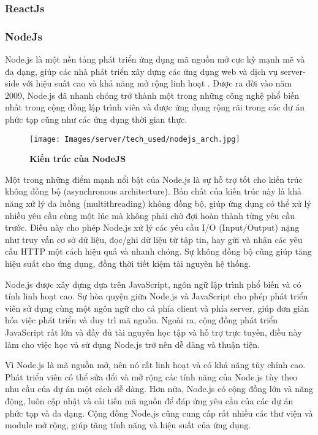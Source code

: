 \subsubsection{ReactJs}

\subsubsection{NodeJs}
\mbox{}

Node.js là một nền tảng phát triển ứng dụng mã nguồn mở cực kỳ mạnh mẽ và đa dạng, giúp các nhà phát triển xây dựng các ứng dụng web và dịch vụ server-side với hiệu suất cao và khả năng mở rộng linh hoạt \cite{nodejs_1}. Được ra đời vào năm 2009, Node.js đã nhanh chóng trở thành một trong những công nghệ phổ biến nhất trong cộng đồng lập trình viên và được ứng dụng rộng rãi trong các dự án phức tạp cũng như các ứng dụng thời gian thực. 

\begin{figure}[H]
  \centering
  \texttt{[image: Images/server/tech\_used/nodejs\_arch.jpg]}
  \caption[Kiến trúc của NodeJS]{\bfseries \fontsize{12pt}{0pt}
  \selectfont Kiến trúc của NodeJS}
  \label{ble_services} %
\end{figure}

Một trong những điểm mạnh nổi bật của Node.js là sự hỗ trợ tốt cho kiến trúc không đồng bộ (asynchronous architecture). Bản chất của kiến trúc này là khả năng xử lý đa luồng (multithreading) không đồng bộ, giúp ứng dụng có thể xử lý nhiều yêu cầu cùng một lúc mà không phải chờ đợi hoàn thành từng yêu cầu trước. Điều này cho phép Node.js xử lý các yêu cầu I/O (Input/Output) nặng như truy vấn cơ sở dữ liệu, đọc/ghi dữ liệu từ tập tin, hay gửi và nhận các yêu cầu HTTP một cách hiệu quả và nhanh chóng. Sự không đồng bộ cũng giúp tăng hiệu suất cho ứng dụng, đồng thời tiết kiệm tài nguyên hệ thống.

Node.js được xây dựng dựa trên JavaScript, ngôn ngữ lập trình phổ biến và có tính linh hoạt cao. Sự hòa quyện giữa Node.js và JavaScript cho phép phát triển viên sử dụng cùng một ngôn ngữ cho cả phía client và phía server, giúp đơn giản hóa việc phát triển và duy trì mã nguồn. Ngoài ra, cộng đồng phát triển JavaScript rất lớn và đầy đủ tài nguyên học tập và hỗ trợ trực tuyến, điều này làm cho việc học và sử dụng Node.js trở nên dễ dàng và thuận tiện.

Vì Node.js là mã nguồn mở, nên nó rất linh hoạt và có khả năng tùy chỉnh cao. Phát triển viên có thể sửa đổi và mở rộng các tính năng của Node.js tùy theo nhu cầu của dự án một cách dễ dàng. Hơn nữa, Node.js có cộng đồng lớn và năng động, luôn cập nhật và cải tiến mã nguồn để đáp ứng yêu cầu của các dự án phức tạp và đa dạng. Cộng đồng Node.js cũng cung cấp rất nhiều các thư viện và module mở rộng, giúp tăng tính năng và hiệu suất của ứng dụng.

